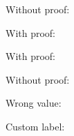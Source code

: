 \documentclass{article}
\theoremstyle{plain}
\begin{document}
Without proof:

With proof:

With proof:

Without proof:

Wrong value:

Custom label:
\end{document}
